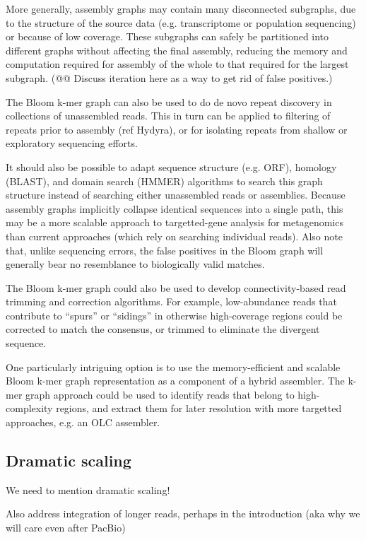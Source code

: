 \documentclass[12pt]{article} \usepackage{simplemargins}
\begin{document}
More generally, assembly graphs may contain many disconnected
subgraphs, due to the structure of the source data (e.g. transcriptome
or population sequencing) or because of low coverage.  These subgraphs
can safely be partitioned into different graphs without affecting the
final assembly, reducing the memory and computation required for
assembly of the whole to that required for the largest subgraph.
(@@ Discuss iteration here as a way to get rid of false positives.)

The Bloom k-mer graph can also be used to do de novo repeat discovery
in collections of unassembled reads.  This in turn can be applied to
filtering of repeats prior to assembly (ref Hydyra), or for isolating
repeats from shallow or exploratory sequencing efforts.

It should also be possible to adapt sequence structure (e.g. ORF),
homology (BLAST), and domain search (HMMER) algorithms to search this
graph structure instead of searching either unassembled reads or
assemblies.  Because assembly graphs implicitly collapse identical
sequences into a single path, this may be a more scalable approach to
targetted-gene analysis for metagenomics than current approaches
(which rely on searching individual reads).  Also note that, unlike
sequencing errors, the false positives in the Bloom graph will
generally bear no resemblance to biologically valid matches.

The Bloom k-mer graph could also be used to develop connectivity-based
read trimming and correction algorithms.  For example, low-abundance
reads that contribute to ``spurs'' or ``sidings'' in otherwise
high-coverage regions could be corrected to match the
consensus, or trimmed to eliminate the divergent sequence.

One particularly intriguing option is to use the memory-efficient and
scalable Bloom k-mer graph representation as a component of a hybrid
assembler.  The k-mer graph approach could be used to identify
reads that belong to high-complexity regions, and extract them for
later resolution with more targetted approaches, e.g. an OLC assembler.

\subsection{Dramatic scaling}

We need to mention dramatic scaling!

Also address integration of longer reads, perhaps in the introduction
(aka why we will care even after PacBio)
\end{document}
